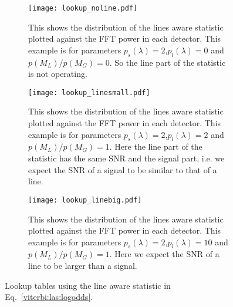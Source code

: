 \begin{figure}[h]
\centering

\begin{subfigure}[h]{\linewidth}
\begin{minipage}{0.65\linewidth}
\texttt{[image: lookup\_noline.pdf]}
\end{minipage}\hfill
\begin{minipage}{0.35\linewidth}
\caption{This shows the distribution of the lines aware statistic plotted against the \ac{FFT} power in each detector. This example is for parameters $p_s(\lambda) = 2$,$p_l(\lambda) = 0$ and $p(M_L)/p(M_G) = 0$. So the line part of the statistic is not operating.}
\label{viterbi:plot:data}
\end{minipage}
\end{subfigure}

\begin{subfigure}[h]{\linewidth}
\begin{minipage}{0.65\linewidth}
\texttt{[image: lookup\_linesmall.pdf]}
\end{minipage}\hfill
\begin{minipage}{0.35\linewidth}
\caption{This shows the distribution of the lines aware statistic plotted against the \ac{FFT} power in each detector. This example is for parameters $p_s(\lambda) = 2$,$p_l(\lambda) = 2$ and $p(M_L)/p(M_G) = 1$. Here the line part of the statistic has the same \ac{SNR} and the signal part, i.e. we expect the \ac{SNR} of a signal to be similar to that of a line.}
\label{viterbi:plot:data}
\end{minipage}
\end{subfigure}

\begin{subfigure}[h]{\linewidth}
\begin{minipage}{0.65\linewidth}
\texttt{[image: lookup\_linebig.pdf]}
\end{minipage}\hfill
\begin{minipage}{0.35\linewidth}
\caption{This shows the distribution of the lines aware statistic plotted against the \ac{FFT} power in each detector. This example is for parameters $p_s(\lambda) = 2$,$p_l(\lambda) = 10$ and $p(M_L)/p(M_G) = 1$. Here we expect the \ac{SNR} of a line to be larger than a signal.}
\label{viterbi:plot:data}
\end{minipage}
\end{subfigure}
\caption{Lookup tables using the line aware statistic in Eq.~\ref{viterbi:las:logodds}.}
\label{viterbi:plots}
\end{figure}

